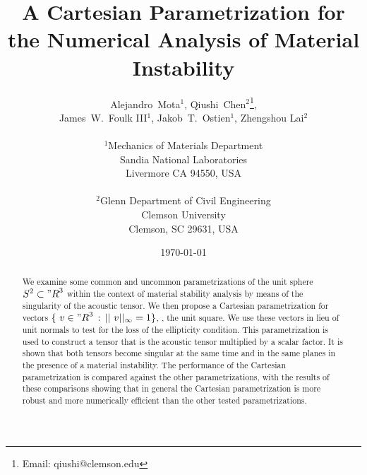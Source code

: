 \documentclass[12pt]{article}
\numberwithin{equation}{section}
\begin{document}





\title{A Cartesian Parametrization for the Numerical Analysis of
  Material Instability}

\author{
  \Large Alejandro~Mota$^1$,
  Qiushi~Chen$^2$\thanks{Email: qiushi@clemson.edu},
  \\
  \Large James~W.~Foulk {III}$^1$,
  Jakob~T.~Ostien$^1$, Zhengshou Lai$^2$
  \\
  \\
  $^1$Mechanics of Materials Department\\
  Sandia National Laboratories\\
  Livermore CA 94550, USA\\
  \\
  $^2$Glenn Department of Civil Engineering\\
  Clemson University\\
  Clemson, SC 29631, USA\\
}

\date{\today}

\maketitle

\begin{abstract}
  We examine some common and uncommon parametrizations of the unit
  sphere $S^2 \subset {"R}^3$ within the context of material stability
  analysis by means of the singularity of the acoustic tensor. We then
  propose a Cartesian parametrization for vectors $\{~v \in {"R}^3 \,
  : \, ||~v||_{\infty} = 1\}$, \ie, the unit square. We use these
  vectors in lieu of unit normals to test for the loss of the
  ellipticity condition. This parametrization is used to construct a
  tensor that is the acoustic tensor multiplied by a scalar factor. It
  is shown that both tensors become singular at the same time and in
  the same planes in the presence of a material instability. The
  performance of the Cartesian parametrization is compared against the
  other parametrizations, with the results of these comparisons
  showing that in general the Cartesian parametrization is more robust
  and more numerically efficient than the other tested
  parametrizations.
\end{abstract}
\end{document}
